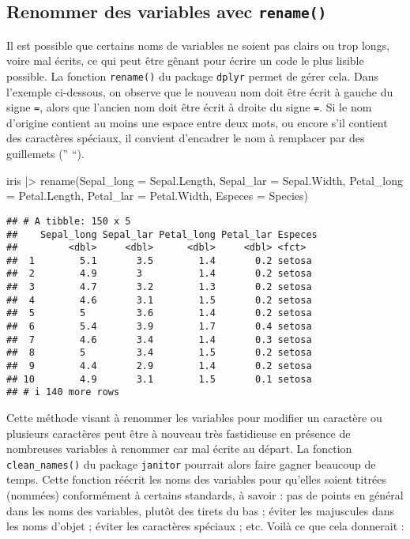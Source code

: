 \documentclass[
]{book}
\newenvironment{Shaded}{\begin{snugshade}}{\end{snugshade}}
\newcommand{\AttributeTok}[1]{\textcolor[rgb]{0.77,0.63,0.00}{#1}}
\newcommand{\FunctionTok}[1]{\textcolor[rgb]{0.00,0.00,0.00}{#1}}
\newcommand{\NormalTok}[1]{#1}
\newcommand{\SpecialCharTok}[1]{\textcolor[rgb]{0.00,0.00,0.00}{#1}}
\begin{document}
\hypertarget{renommer-des-variables-avec-rename}{%
\subsection{\texorpdfstring{Renommer des variables avec \texttt{rename()}}{Renommer des variables avec rename()}}\label{renommer-des-variables-avec-rename}}

Il est possible que certains noms de variables ne soient pas clairs ou trop longs, voire mal écrits, ce qui peut être gênant pour écrire un code le plus lisible possible. La fonction \texttt{rename()} du package \texttt{dplyr} permet de gérer cela. Dans l'exemple ci-dessous, on observe que le nouveau nom doit être écrit à gauche du signe \texttt{=}, alors que l'ancien nom doit être écrit à droite du signe \texttt{=}. Si le nom d'origine contient au moins une espace entre deux mots, ou encore s'il contient des caractères spéciaux, il convient d'encadrer le nom à remplacer par des guillemets ('' ``).

\begin{Shaded}
\begin{Highlighting}[]
\NormalTok{iris }\SpecialCharTok{|\textgreater{}} 
  \FunctionTok{rename}\NormalTok{(}\AttributeTok{Sepal\_long =}\NormalTok{ Sepal.Length,}
         \AttributeTok{Sepal\_lar =}\NormalTok{ Sepal.Width,}
         \AttributeTok{Petal\_long =}\NormalTok{ Petal.Length,}
         \AttributeTok{Petal\_lar =}\NormalTok{ Petal.Width,}
         \AttributeTok{Especes =}\NormalTok{ Species)}
\end{Highlighting}
\end{Shaded}

\begin{verbatim}
## # A tibble: 150 x 5
##    Sepal_long Sepal_lar Petal_long Petal_lar Especes
##         <dbl>     <dbl>      <dbl>     <dbl> <fct>  
##  1        5.1       3.5        1.4       0.2 setosa 
##  2        4.9       3          1.4       0.2 setosa 
##  3        4.7       3.2        1.3       0.2 setosa 
##  4        4.6       3.1        1.5       0.2 setosa 
##  5        5         3.6        1.4       0.2 setosa 
##  6        5.4       3.9        1.7       0.4 setosa 
##  7        4.6       3.4        1.4       0.3 setosa 
##  8        5         3.4        1.5       0.2 setosa 
##  9        4.4       2.9        1.4       0.2 setosa 
## 10        4.9       3.1        1.5       0.1 setosa 
## # i 140 more rows
\end{verbatim}

Cette méthode visant à renommer les variables pour modifier un caractère ou plusieurs caractères peut être à nouveau très fastidieuse en présence de nombreuses variables à renommer car mal écrite au départ. La fonction \texttt{clean\_names()} du package \texttt{janitor} pourrait alors faire gagner beaucoup de temps. Cette fonction réécrit les noms des variables pour qu'elles soient titrées (nommées) conformément à certains standards, à savoir : pas de points en général dans les noms des variables, plutôt des tirets du bas ; éviter les majuscules dans les noms d'objet ; éviter les caractères spéciaux ; etc. Voilà ce que cela donnerait :
\end{document}
